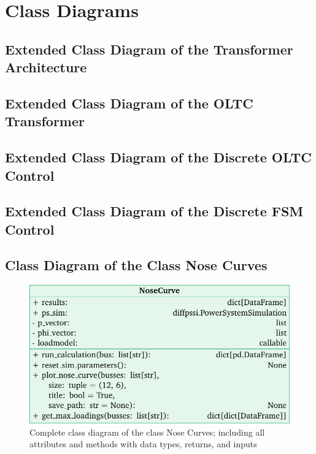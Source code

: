 \section{Class Diagrams}

\subsection{Extended Class Diagram of the Transformer Architecture}

\subsection{Extended Class Diagram of the OLTC Transformer}

\subsection{Extended Class Diagram of the Discrete OLTC Control}
\subsection{Extended Class Diagram of the Discrete FSM Control}

\subsection{Class Diagram of the Class Nose Curves}
\label{app:nose-curve}

\begin{figure}[H]
    \centering
    \includegraphics[width=12cm]{tikz_graphics/images/class_diagram_nosecurve_complete.pdf}
    \caption{Complete class diagram of the class Nose Curves; including all attributes and methods with data types, returns, and inputs}
    \label{fig:class-diagram-nose-curves}
\end{figure}


